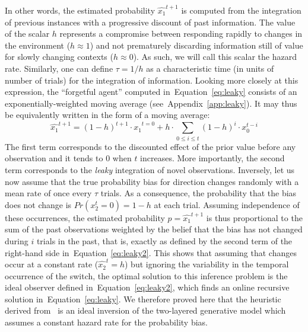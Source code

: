 \documentclass[12pt,english]{article}%
\newcommand{\eql}[1]{\begin{equation}#1\end{equation}}
\newcommand{\citet}[1]{\textcite{#1}}
\newcommand{\seeEq}[1]{Equation~\ref{eq:#1}}
\newcommand{\seeApp}[1]{Appendix~\ref{app:#1}}
\begin{document}
In other words, the estimated probability $\hat{x_1}^{t+1}$ is computed
from the integration of previous instances
with a progressive discount of past information.
The value of the scalar $h$ represents
a compromise between responding rapidly
to changes in the environment ($h \approx 1$) and
not prematurely discarding information still of value
for slowly changing contexts  ($h \approx 0$).
As such, we will call this scalar the hazard rate.
Similarly, one can define $\tau = 1 / h$ as
a characteristic time (in units of number of trials)
for the integration of information.
Looking more closely at this expression,
the ``forgetful agent'' computed in~\seeEq{leaky}
consists of an exponentially-weighted moving average (see~\seeApp{leaky}).
It may thus be equivalently written in the form of a moving average:
\eql{
\hat{x_1}^{t+1} = (1-h)^{t+1} \cdot \hat{x_1}^{t=0} + h \cdot \sum_{0\leq i \leq t} (1 - h)^{i} \cdot x_0^{t-i}
\label{eq:leaky2}}
The first term corresponds to the discounted effect of the prior value before any observation and it tends to $0$ when $t$ increases. 
More importantly, the second term corresponds to the \emph{leaky} integration of novel observations.
Inversely, let us now assume that
the true probability bias for direction changes randomly with a mean rate of once
every $\tau$ trials.
As a consequence, the probability that the bias does not change is $Pr(x_2^t=0)=1-h$ at each trial.
Assuming independence of these occurrences, the estimated probability $p=\hat{x_1}^{t+1}$ is thus proportional to the sum
of the past observations weighted by the belief that the bias has not changed during $i$ trials in the past, that is, exactly as defined by the second term of the right-hand side in~\seeEq{leaky2}.
This shows that
assuming that changes occur at a constant rate ($\hat{x_2}^t=h$)
but ignoring the variability in the temporal occurrence of the switch,
the optimal solution to this inference problem is the
ideal observer defined in~\seeEq{leaky2},
which finds an online recursive solution in~\seeEq{leaky}.
We therefore proved here that the heuristic derived from~\citet{Anderson2006}
is an ideal inversion of the two-layered generative model
which assumes a constant hazard rate for the probability bias.
\end{document}

